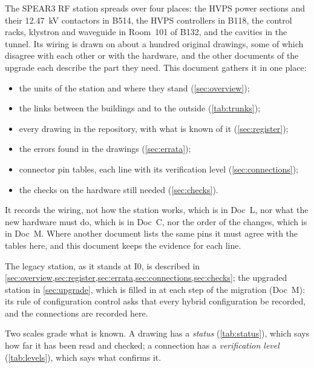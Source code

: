 The SPEAR3 RF station spreads over four places: the HVPS power sections and their
\qty{12.47}{\kilo\volt} contactors in B514, the HVPS controllers in B118, the control
racks, klystron and waveguide in Room~101 of B132, and the cavities in the tunnel. Its
wiring is drawn on about a hundred original drawings, some of which disagree with each
other or with the hardware, and the other documents of the upgrade each describe the
part they need. This document gathers it in one place:
\begin{itemize}
\item the units of the station and where they stand (\cref{sec:overview});
\item the links between the buildings and to the outside (\cref{tab:trunks});
\item every drawing in the repository, with what is known of it (\cref{sec:register});
\item the errors found in the drawings (\cref{sec:errata});
\item connector pin tables, each line with its verification level
  (\cref{sec:connections});
\item the checks on the hardware still needed (\cref{sec:checks}).
\end{itemize}

It records the wiring, not how the station works, which is in Doc~L, nor what the new
hardware must do, which is in Doc~C, nor the order of the changes, which is in Doc~M.
Where another document lists the same pins it must agree with the tables here, and
this document keeps the evidence for each line.

The legacy station, as it stands at I0, is described in
\cref{sec:overview,sec:register,sec:errata,sec:connections,sec:checks}; the upgraded
station in \cref{sec:upgrade}, which is filled in at each step of the migration
(Doc~M): its rule of configuration control asks that every hybrid configuration be
recorded, and the connections are recorded here.

Two scales grade what is known. A drawing has a \emph{status} (\cref{tab:status}),
which says how far it has been read and checked; a connection has a
\emph{verification level} (\cref{tab:levels}), which says what confirms it.


